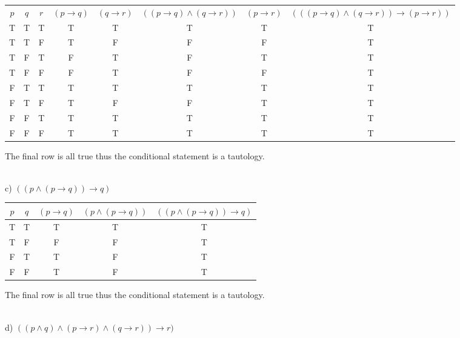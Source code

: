 \documentclass{article}
\begin{document}
\begin{flushleft}
\begin{table}[ht]

\begin{tabular}{|c|c|c||c|c|c|c|c|}

$ p $ & $ q $ & $ r $ & $ (p \rightarrow q) $ & $ (q \rightarrow r) $ & $ ((p \rightarrow q) \wedge (q \rightarrow r)) $ & $ (p \rightarrow r) $ & $ (((p \rightarrow q) \wedge (q \rightarrow r)) \rightarrow (p \rightarrow r)) $ \\

T & T & T & T & T & T & T & T \\
\hline
T & T & F & T & F & F & F & T \\
\hline
T & F & T & F & T & F & T & T \\
\hline
T & F & F & F & T & F & F & T \\
\hline
F & T & T & T & T & T & T & T \\
\hline
F & T & F & T & F & F & T & T \\
\hline
F & F & T & T & T & T & T & T \\
\hline
F & F & F & T & T & T & T & T \\

\end{tabular}
\label{table:tt1}
\end{table}
The final row is all true thus the conditional statement is a tautology.

~\\

\setlength\parindent{0pt}c) $((p \land (p \rightarrow q))\rightarrow q)$

\begin{table}[ht]

\begin{tabular}{|c|c||c|c|c|}

$ p $ & $ q $ & $ (p \rightarrow q) $ & $ (p \wedge (p \rightarrow q)) $ & $ ((p \wedge (p \rightarrow q)) \rightarrow q) $ \\
\hline
T & T & T & T & T \\
\hline
T & F & F & F & T \\
\hline
F & T & T & F & T \\
\hline
F & F & T & F & T \\

\end{tabular}
\label{table:tt1}
\end{table}
The final row is all true thus the conditional statement is a tautology.

~\\
\setlength\parindent{0pt}d) $((p \land q)\land (p \rightarrow r) \land (q	 \rightarrow r)) \rightarrow r)$


\end{flushleft}
\end{document}
